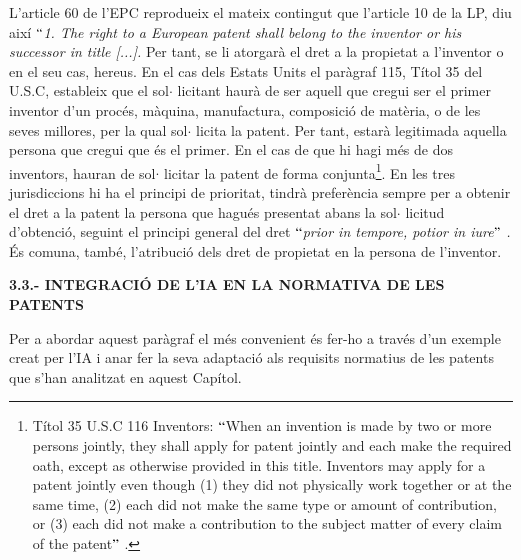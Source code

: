 \documentclass[12pt]{article}
\begin{document}
\vspace{\baselineskip}
\begin{justify}
L’article 60 de l’EPC reprodueix el mateix contingut que l’article 10 de la LP, diu així $``$\textit{1. The right to a European patent shall belong to the inventor or his successor in title [...]. }Per tant, se li atorgarà el dret a la propietat a l’inventor o en el seu cas, hereus. En el cas dels Estats Units el paràgraf 115, Títol 35 del U.S.C, estableix que el sol$ \cdot $ licitant haurà de ser aquell que cregui ser el primer inventor d’un procés, màquina, manufactura, composició de matèria, o de les seves millores, per la qual sol$ \cdot $ licita la patent. Per tant, estarà legitimada aquella persona que cregui que és el primer. En el cas de que hi hagi més de dos inventors, hauran de sol$ \cdot $ licitar la patent de forma conjunta\footnote{ Títol 35 U.S.C 116 Inventors: $``$When an invention is made by two or more persons jointly, they shall apply for patent jointly and each make the required oath, except as otherwise provided in this title. Inventors may apply for a patent jointly even though (1) they did not physically work together or at the same time, (2) each did not make the same type or amount of contribution, or (3) each did not make a contribution to the subject matter of every claim of the patent$"$ . }.  En les tres jurisdiccions hi ha el principi de prioritat, tindrà preferència sempre per a obtenir el dret a la patent la persona que hagués presentat abans la sol$ \cdot $ licitud d’obtenció, seguint el principi general del dret $``$\textit{prior in tempore, potior in iure$"$ . }És comuna, també, l’atribució dels dret de propietat en la persona de l’inventor.
\end{justify}\par


\vspace{\baselineskip}
\begin{justify}
\textbf{3.3.- INTEGRACIÓ DE L’IA EN LA NORMATIVA DE LES PATENTS}
\end{justify}\par


\vspace{\baselineskip}
\begin{justify}
Per a abordar aquest paràgraf el més convenient és fer-ho a través d’un exemple creat per l’IA i anar fer la seva adaptació als requisits normatius de les patents que s’han analitzat en aquest Capítol. 
\end{justify}\par
\end{document}

